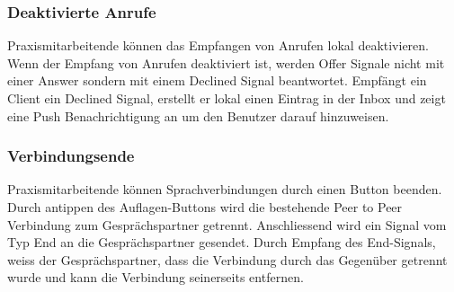 \subsubsection{Deaktivierte Anrufe}

Praxismitarbeitende können das Empfangen von Anrufen lokal deaktivieren.
Wenn der Empfang von Anrufen deaktiviert ist, werden Offer Signale nicht mit einer Answer sondern mit einem Declined Signal beantwortet.
Empfängt ein Client ein Declined Signal, erstellt er lokal einen Eintrag in der Inbox und zeigt eine Push Benachrichtigung an um den Benutzer darauf hinzuweisen.

\subsubsection{Verbindungsende}

Praxismitarbeitende können Sprachverbindungen durch einen Button beenden.
Durch antippen des Auflagen-Buttons wird die bestehende Peer to Peer Verbindung zum Gesprächspartner getrennt.
Anschliessend wird ein Signal vom Typ End an die Gesprächspartner gesendet.
Durch Empfang des End-Signals, weiss der Gesprächspartner, dass die Verbindung durch das Gegenüber getrennt wurde und kann die Verbindung seinerseits entfernen.


\clearpage
